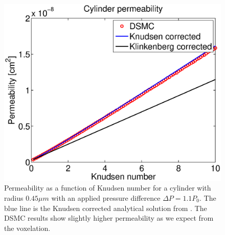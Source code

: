 \begin{figure}[h]
\begin{center}
\includegraphics[width=\textwidth, trim=0cm 0cm 0cm 0cm, clip]{DSMC/figures/cylinder_knudsen_permeability.eps}
\end{center}
\caption{Permeability as a function of Knudsen number for a cylinder with radius $0.45 \mu m$ with an applied pressure difference $\Delta P = 1.1P_0$. The blue line is the Knudsen corrected analytical solution from \cite{karniadakis2005microflows}. The DSMC results show slightly higher permeability as we expect from the voxelation.}
\label{fig:one_cylinder_varying_knudsen}
\end{figure}

